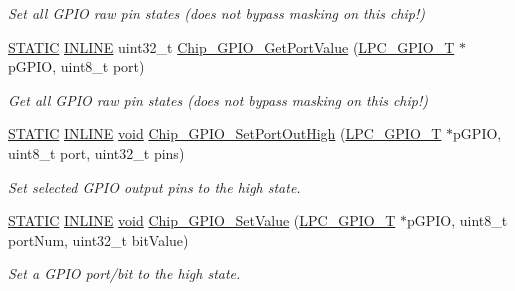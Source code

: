 \begin{DoxyCompactItemize}
\begin{DoxyCompactList}\small\item\em Set all G\-P\-I\-O raw pin states (does not bypass masking on this chip!) \end{DoxyCompactList}\item 
\hyperlink{group__LPC__Types__Public__Macros_ga10b2d890d871e1489bb02b7e70d9bdfb}{S\-T\-A\-T\-I\-C} \hyperlink{group__LPC__Types__Public__Types_ga2eb6f9e0395b47b8d5e3eeae4fe0c116}{I\-N\-L\-I\-N\-E} uint32\-\_\-t \hyperlink{group__GPIO__17XX__40XX_ga14c7161208fed3f7ac4e62953353ab9b}{Chip\-\_\-\-G\-P\-I\-O\-\_\-\-Get\-Port\-Value} (\hyperlink{structLPC__GPIO__T}{L\-P\-C\-\_\-\-G\-P\-I\-O\-\_\-\-T} $\ast$p\-G\-P\-I\-O, uint8\-\_\-t port)
\begin{DoxyCompactList}\small\item\em Get all G\-P\-I\-O raw pin states (does not bypass masking on this chip!) \end{DoxyCompactList}\item 
\hyperlink{group__LPC__Types__Public__Macros_ga10b2d890d871e1489bb02b7e70d9bdfb}{S\-T\-A\-T\-I\-C} \hyperlink{group__LPC__Types__Public__Types_ga2eb6f9e0395b47b8d5e3eeae4fe0c116}{I\-N\-L\-I\-N\-E} \hyperlink{Paradigm_2Tern__EE_2small_2portmacro_8h_a14d32f8130d3c0b212cfc751730b5b49}{void} \hyperlink{group__GPIO__17XX__40XX_ga8a9b2dd9c70e835b718c2edc5b9701af}{Chip\-\_\-\-G\-P\-I\-O\-\_\-\-Set\-Port\-Out\-High} (\hyperlink{structLPC__GPIO__T}{L\-P\-C\-\_\-\-G\-P\-I\-O\-\_\-\-T} $\ast$p\-G\-P\-I\-O, uint8\-\_\-t port, uint32\-\_\-t pins)
\begin{DoxyCompactList}\small\item\em Set selected G\-P\-I\-O output pins to the high state. \end{DoxyCompactList}\item 
\hyperlink{group__LPC__Types__Public__Macros_ga10b2d890d871e1489bb02b7e70d9bdfb}{S\-T\-A\-T\-I\-C} \hyperlink{group__LPC__Types__Public__Types_ga2eb6f9e0395b47b8d5e3eeae4fe0c116}{I\-N\-L\-I\-N\-E} \hyperlink{Paradigm_2Tern__EE_2small_2portmacro_8h_a14d32f8130d3c0b212cfc751730b5b49}{void} \hyperlink{group__GPIO__17XX__40XX_ga88bed30fb124192d45c7bed021636643}{Chip\-\_\-\-G\-P\-I\-O\-\_\-\-Set\-Value} (\hyperlink{structLPC__GPIO__T}{L\-P\-C\-\_\-\-G\-P\-I\-O\-\_\-\-T} $\ast$p\-G\-P\-I\-O, uint8\-\_\-t port\-Num, uint32\-\_\-t bit\-Value)
\begin{DoxyCompactList}\small\item\em Set a G\-P\-I\-O port/bit to the high state. \end{DoxyCompactList}\item 

\end{DoxyCompactItemize}
